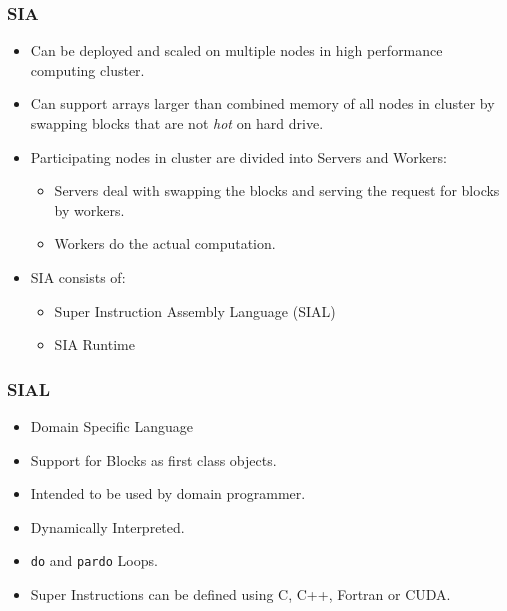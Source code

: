 \documentclass{beamer}
\begin{document}
\begin{frame}\frametitle{SIA}
  \begin{itemize}
    \pause
  \item Can be deployed and scaled on multiple nodes in high performance computing cluster.
    \pause
  \item Can support arrays larger than combined memory of all nodes in cluster by
    swapping blocks that are not \textit{hot} on hard drive.
    \pause
  \item Participating nodes in cluster are divided into Servers and Workers:
    \begin{itemize}
      \pause
    \item Servers deal with swapping the blocks and serving the request for blocks
      by workers.
      \pause
    \item Workers do the actual computation.
    \end{itemize}
    \pause
  \item SIA consists of:
    \begin{itemize}
      \pause
    \item Super Instruction Assembly Language (SIAL)
      \pause
    \item SIA Runtime
    \end{itemize}
  \end{itemize}
\end{frame}

\begin{frame}\frametitle{SIAL}
  \begin{itemize}
    \pause
  \item Domain Specific Language
    \pause
  \item Support for Blocks as first class objects.
    \pause
  \item Intended to be used by domain programmer.
    \pause
  \item Dynamically Interpreted.
    \pause
  \item \texttt{do} and \texttt{pardo} Loops.
    \pause
  \item Super Instructions can be defined using C, C++, Fortran
    \pause
    or CUDA.
  \end{itemize}
\end{frame}
\end{document}
